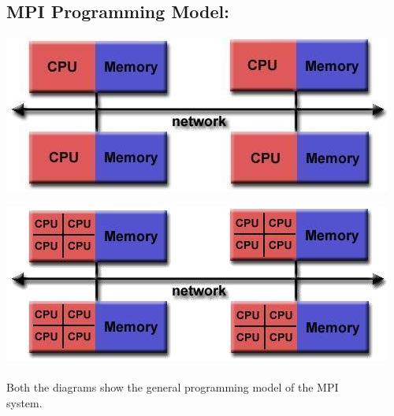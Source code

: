 \documentclass[10pt,a4paper]{article}
\begin{document}
		
\subsection{MPI Programming Model:}	

		\includegraphics{MPI_01}

		  
		\includegraphics{MPI_02}
		\\
		\\
		Both the diagrams show the general programming model of the 
		MPI \\ system.
		
		
\end{document}
